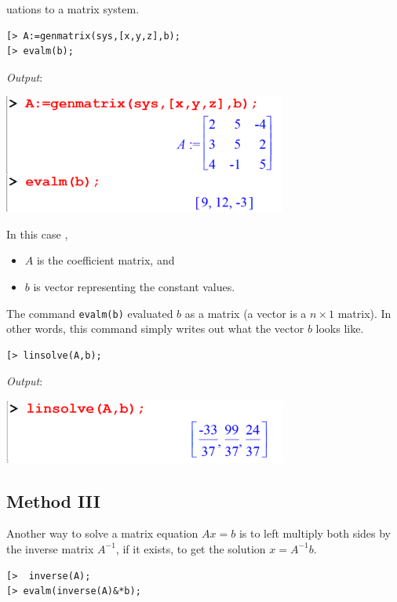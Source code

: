 \documentclass[
]{book}
\providecommand{\tightlist}{%
  \setlength{\itemsep}{0pt}\setlength{\parskip}{0pt}}
\theoremstyle{definition}
\theoremstyle{definition}
\theoremstyle{definition}
\theoremstyle{definition}
\theoremstyle{remark}
\begin{document}
uations to a matrix system.

\begin{verbatim}
[> A:=genmatrix(sys,[x,y,z],b);
[> evalm(b);
\end{verbatim}

\emph{Output}:

\includegraphics[width=0.7\textwidth,height=\textheight]{figures/Lesson 5/fig6.png}

In this case ,

\begin{itemize}
\tightlist
\item
  \(A\) is the coefficient matrix, and
\item
  \(b\) is vector representing the constant values.
\end{itemize}

The command \texttt{evalm(b)} evaluated \(b\) as a matrix (a vector is a \(n \times 1\) matrix).
In other words, this command simply writes out what the vector \(b\) looks like.

\begin{verbatim}
[> linsolve(A,b);
\end{verbatim}

\emph{Output}:

\includegraphics[width=0.7\textwidth,height=\textheight]{figures/Lesson 5/fig7.png}

\subsection{Method III}\label{method-iii}

Another way to solve a matrix equation \(Ax = b\) is to left multiply both sides by the inverse matrix \(A^{-1}\), if it exists, to get the solution \(x = A^{-1}b\).

\begin{verbatim}
[>  inverse(A);
[> evalm(inverse(A)&*b);
\end{verbatim}
\end{document}
